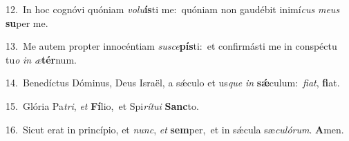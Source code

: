{\numbfont\textcolor{\numbcolor}{12.}}~In hoc cognóvi quóniam \textit{vo}\-\textit{lu}\textbf{ís}ti me:~\star quóniam non gaudébit inimí\textit{cus} \textit{me}\-\textit{us} \textbf{su}\-per me.\par
{\numbfont\textcolor{\numbcolor}{13.}}~Me autem propter innocéntiam \textit{su}\-\textit{sce}\textbf{pís}ti:~\star et confirmásti me in conspéctu tu\textit{o} \textit{in} \textit{æ}\-\textbf{tér}num.\par
{\numbfont\textcolor{\numbcolor}{14.}}~Benedíctus Dóminus, Deus Israël, a sǽculo et us\textit{que} \textit{in} \textbf{sǽ}\-culum:~\star \textit{fi}\-\textit{at}, \textbf{fi}\-at.\par
{\numbfont\textcolor{\numbcolor}{15.}}~Glória Pa\-\textit{tri}\-, \textit{et} \textbf{Fí}\-lio,~\star et Spi\-\textit{rí}\-\textit{tu}\textit{i} \textbf{Sanc}\-to.\par
{\numbfont\textcolor{\numbcolor}{16.}}~Sicut erat in princípio, et \textit{nunc}\-, \textit{et} \textbf{sem}\-per,~\star et in sǽcula sæ\-\textit{cu}\-\textit{ló}\textit{rum}. \textbf{A}\-men.\par
